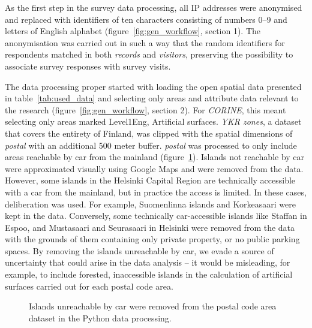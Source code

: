 As the first step in the survey data processing, all IP addresses were anonymised and replaced with identifiers of ten characters consisting of numbers 0--9 and letters of English alphabet (figure~\ref{fig:gen_workflow}, section 1). The anonymisation was carried out in such a way that the random identifiers for respondents matched in both \textit{records} and \textit{visitors}, preserving the possibility to associate survey responses with survey visits. 

The data processing proper started with loading the open spatial data presented in table~\ref{tab:used_data} and selecting only areas and attribute data relevant to the research (figure~\ref{fig:gen_workflow}, section 2). For \textit{CORINE}, this meant selecting only areas marked Level1Eng, Artificial surfaces. \textit{YKR zones}, a dataset that covers the entirety of Finland, was clipped with the spatial dimensions of \textit{postal} with an additional 500 meter buffer. \textit{postal} was processed to only include areas reachable by car from the mainland (figure~\ref{fig:paavo_resarea}). Islands not reachable by car were approximated visually using Google Maps and were removed from the data. However, some islands in the Helsinki Capital Region are technically accessible with a car from the mainland, but in practice the access is limited. In these cases, deliberation was used. For example, Suomenlinna islands and Korkeasaari were kept in the data. Conversely, some technically car-accessible islands like Staffan in Espoo, and Mustasaari and Seurasaari in Helsinki were removed from the data with the grounds of them containing only private property, or no public parking spaces. By removing the islands unreachable by car, we evade a source of uncertainty that could arise in the data analysis -- it would be misleading, for example, to include forested, inaccessible islands in the calculation of artificial surfaces carried out for each postal code area.

\begin{figure}[H]%
    \centering
    \quad
    \caption[Process to remove islands not reachable by car]{Islands unreachable by car were removed from the postal code area dataset in the Python data processing.}%
    \label{fig:paavo_resarea}%
\end{figure}

